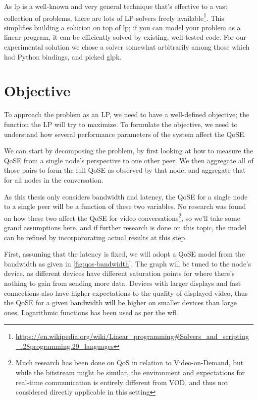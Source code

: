 As \gls{lp} is a well-known and very general technique that's effective to a vast collection of problems, there are lots of LP-solvers freely available\footnote{\url{https://en.wikipedia.org/wiki/Linear_programming\#Solvers_and_scripting_.28programming.29_languages}}. This simplifies building a solution on top of \gls{lp}; if you can model your problem as a linear program, it can be efficiently solved by existing, well-tested code. For our experimental solution we chose a solver somewhat arbitrarily among those which had Python bindings, and picked \gls{glpk}.


\section{Objective}

To approach the problem as an LP, we need to have a well-defined objective; the function the LP will try to maximize. To formulate the objective, we need to understand how several performance parameters of the system affect the QoSE.

We can start by decomposing the problem, by first looking at how to measure the QoSE from a single node's perspective to one other peer. We then aggregate all of those pairs to form the full QoSE as observed by that node, and aggregate that for all nodes in the conversation.

As this thesis only considers bandwidth and latency, the QoSE for a single node to a single peer will be a function of these two variables. No research was found on how these two affect the QoSE for video conversations\footnote{Much research has been done on QoS in relation to Video-on-Demand, but while the bitstream might be similar, the environment and expectations for real-time communication is entirely different from VOD, and thus not considered directly applicable in this setting}, so we'll take some grand assumptions here, and if further research is done on this topic, the model can be refined by incorpororating actual results at this step.

First, assuming that the latency is fixed, we will adopt a QoSE model from the bandwidth as given in \autoref{fig:qos-bandwidth}. The graph will be tuned to the node's device, as different devices have different saturation points for where there's nothing to gain from sending more data. Devices with larger displays and fast connections also have higher expectations to the quality of displayed video, thus the QoSE for a given bandwidth will be higher on smaller devices than large ones. Logarithmic functions has been used as per the \gls{wfl}.

